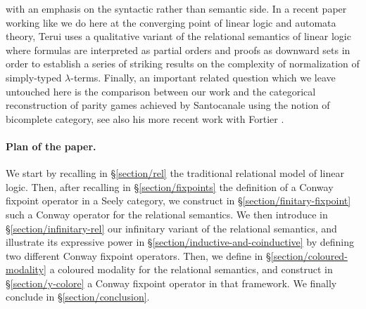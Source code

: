 \documentclass[runningheads,a4paper]{llncs}
\begin{document}
with an emphasis on the syntactic rather than semantic side.
In a recent paper working like we do here at the converging point of linear logic and automata theory, 
Terui \cite{terui} uses a qualitative variant of the relational semantics of linear logic
where formulas are interpreted as partial orders and proofs as downward sets in order to
establish a series of striking results on the complexity of normalization of simply-typed $\lambda$-terms.
Finally, an important related question which we leave untouched here is the comparison
between our work
and the categorical reconstruction of parity games achieved by Santocanale
\cite{santocanale2,santocanale} using the notion of bicomplete category,
see also his more recent work with Fortier \cite{santocanale3}.






\paragraph*{Plan of the paper.}
We start by recalling in \S\ref{section/rel} the traditional relational model of linear logic.
Then, after recalling in \S\ref{section/fixpoints} the definition of a Conway fixpoint operator in a Seely category,
we construct in \S\ref{section/finitary-fixpoint} such a Conway operator for the relational semantics.
We then introduce in \S\ref{section/infinitary-rel} our infinitary variant of the relational semantics,
and illustrate its expressive power in \S\ref{section/inductive-and-coinductive} by defining two
different Conway fixpoint operators.
Then, we define in \S\ref{section/coloured-modality} a coloured modality for the relational semantics,
and construct in \S\ref{section/y-colore} a Conway fixpoint operator in that framework.
We finally conclude in \S\ref{section/conclusion}.
\end{document}

